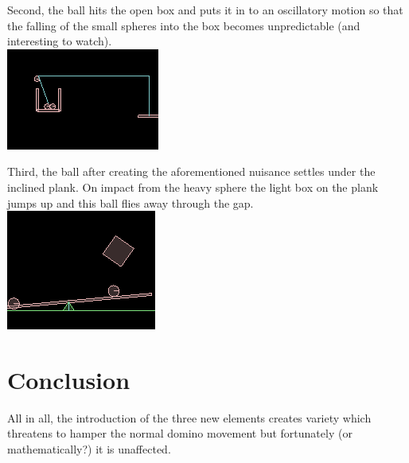 \documentclass[11pt]{article}
\begin{document}
Second, the ball hits the open box and puts it in to an oscillatory motion so that the falling of the small spheres into the box becomes unpredictable (and interesting to watch).\\

\includegraphics[scale=0.7,natwidth=190,natheight=126]{./32.png}

Third, the ball after creating the aforementioned nuisance settles under the inclined plank.
On impact from the heavy sphere the light box on the plank jumps up and this ball flies away through the gap.\\

\includegraphics[scale=0.7,natwidth=186,natheight=149]{./33.png}

\pagebreak

\section{Conclusion}

All in all, the introduction of the three new elements creates variety which threatens to hamper the normal domino movement but fortunately (or mathematically?) it is unaffected.



\end{document}
